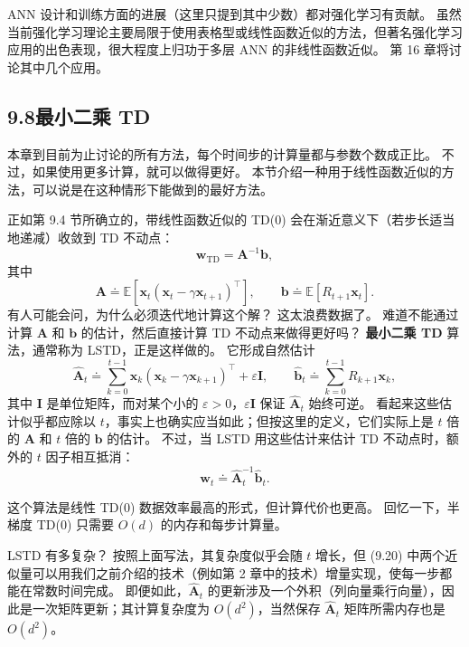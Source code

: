 \documentclass[UTF8, 12pt, fontset=fandol, oneside]{ctexart}
\begin{document}
ANN 设计和训练方面的进展（这里只提到其中少数）都对强化学习有贡献。
虽然当前强化学习理论主要局限于使用表格型或线性函数近似的方法，但著名强化学习应用的出色表现，很大程度上归功于多层 ANN 的非线性函数近似。
第 16 章将讨论其中几个应用。

\subsection*{9.8\quad 最小二乘 TD}

本章到目前为止讨论的所有方法，每个时间步的计算量都与参数个数成正比。
不过，如果使用更多计算，就可以做得更好。
本节介绍一种用于线性函数近似的方法，可以说是在这种情形下能做到的最好方法。

正如第 9.4 节所确立的，带线性函数近似的 TD(0) 会在渐近意义下（若步长适当地递减）收敛到 TD 不动点：
\[
\mathbf{w}_{\mathrm{TD}}=\mathbf{A}^{-1}\mathbf{b},
\]
其中
\[
\mathbf{A}\doteq\mathbb{E}\!\left[\mathbf{x}_t(\mathbf{x}_t-\gamma\mathbf{x}_{t+1})^\top\right],
\qquad
\mathbf{b}\doteq\mathbb{E}[R_{t+1}\mathbf{x}_t].
\]
有人可能会问，为什么必须迭代地计算这个解？
这太浪费数据了。
难道不能通过计算 $\mathbf{A}$ 和 $\mathbf{b}$ 的估计，然后直接计算 TD 不动点来做得更好吗？
\textbf{最小二乘 TD} 算法，通常称为 LSTD，正是这样做的。
它形成自然估计
\begin{equation}
\hat{\mathbf{A}}_t\doteq
\sum_{k=0}^{t-1}\mathbf{x}_k(\mathbf{x}_k-\gamma\mathbf{x}_{k+1})^\top+\varepsilon\mathbf{I},
\qquad
\hat{\mathbf{b}}_t\doteq
\sum_{k=0}^{t-1}R_{k+1}\mathbf{x}_k,
\tag{9.20}
\end{equation}
其中 $\mathbf{I}$ 是单位矩阵，而对某个小的 $\varepsilon>0$，$\varepsilon\mathbf{I}$ 保证 $\hat{\mathbf{A}}_t$ 始终可逆。
看起来这些估计似乎都应除以 $t$，事实上也确实应当如此；但按这里的定义，它们实际上是 $t$ 倍的 $\mathbf{A}$ 和 $t$ 倍的 $\mathbf{b}$ 的估计。
不过，当 LSTD 用这些估计来估计 TD 不动点时，额外的 $t$ 因子相互抵消：
\begin{equation}
\mathbf{w}_t\doteq \hat{\mathbf{A}}_t^{-1}\hat{\mathbf{b}}_t.
\tag{9.21}
\end{equation}

这个算法是线性 TD(0) 数据效率最高的形式，但计算代价也更高。
回忆一下，半梯度 TD(0) 只需要 $O(d)$ 的内存和每步计算量。

LSTD 有多复杂？
按照上面写法，其复杂度似乎会随 $t$ 增长，但 (9.20) 中两个近似量可以用我们之前介绍的技术（例如第 2 章中的技术）增量实现，使每一步都能在常数时间完成。
即便如此，$\hat{\mathbf{A}}_t$ 的更新涉及一个外积（列向量乘行向量），因此是一次矩阵更新；其计算复杂度为 $O(d^2)$，当然保存 $\hat{\mathbf{A}}_t$ 矩阵所需内存也是 $O(d^2)$。
\end{document}
